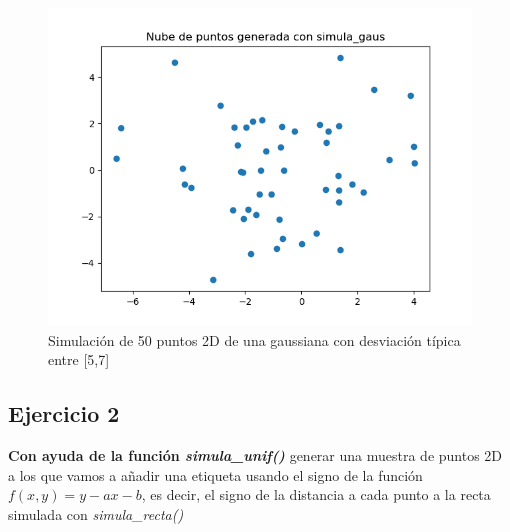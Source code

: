 \begin{itemize}
	\begin{figure}[H] %
		\centering
		\includegraphics[scale=0.5]{simula_gauss1.png}  %
		\caption{Simulación de 50 puntos 2D de una gaussiana con desviación típica entre [5,7]} 
		\label{fig:simula-gauss}
	\end{figure}
\end{itemize}

\subsection{Ejercicio 2}

\textbf{Con ayuda de la función \textit{simula\_unif()}} generar una muestra de puntos 2D a los que vamos a añadir una etiqueta usando el signo de la función $f(x,y) = y -ax-b$, es decir, el signo de la distancia a cada punto a la recta simulada con \textit{simula\_recta()}

